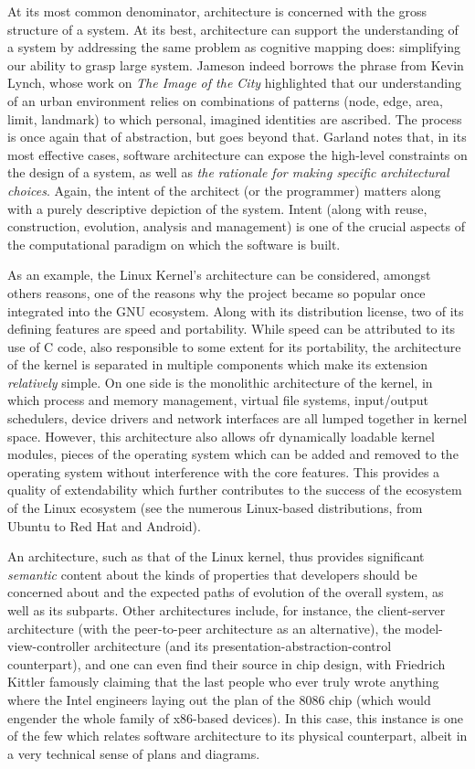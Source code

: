\documentclass{article}
\begin{document}
At its most common denominator, architecture is concerned with the gross structure of a system. At its best, architecture can support the understanding of a system by addressing the same problem as cognitive mapping does: simplifying our ability to grasp large system. Jameson indeed borrows the phrase from Kevin Lynch, whose work on \emph{The Image of the City} highlighted that our understanding of an urban environment relies on combinations of patterns (node, edge, area, limit, landmark) to which personal, imagined identities are ascribed. The process is once again that of abstraction, but goes beyond that. Garland notes that, in its most effective cases, software architecture can expose the high-level constraints on the design of a system, as well as \emph{the rationale for making specific architectural choices}. Again, the intent of the architect (or the programmer) matters along with a purely descriptive depiction of the system. Intent (along with reuse, construction, evolution, analysis and management) is one of the crucial aspects of the computational paradigm on which the software is built.

As an example, the Linux Kernel's architecture can be considered, amongst others reasons, one of the reasons why the project became so popular once integrated into the GNU ecosystem. Along with its distribution license, two of its defining features are speed and portability. While speed can be attributed to its use of C code, also responsible to some extent for its portability, the architecture of the kernel is separated in multiple components which make its extension \emph{relatively} simple. On one side is the monolithic architecture of the kernel, in which process and memory management, virtual file systems, input/output schedulers, device drivers and network interfaces are all lumped together in kernel space. However, this architecture also allows ofr dynamically loadable kernel modules, pieces of the operating system which can be added and removed to the operating system without interference with the core features. This provides a quality of extendability which further contributes to the success of the ecosystem of the Linux ecosystem (see the numerous Linux-based distributions, from Ubuntu to Red Hat and Android).

An architecture, such as that of the Linux kernel, thus provides significant \emph{semantic}  content  about  the  kinds  of properties that developers should be concerned about and the expected paths of evolution of the overall system, as well as its subparts. Other architectures include, for instance, the client-server architecture (with the peer-to-peer architecture as an alternative), the model-view-controller architecture (and its presentation-abstraction-control counterpart), and one can even find their source in chip design, with Friedrich Kittler famously claiming that the last people who ever truly wrote anything where the Intel engineers laying out the plan of the 8086 chip (which would engender the whole family of x86-based devices)\cite{kittler_there_1997}. In this case, this instance is one of the few which relates software architecture to its physical counterpart, albeit in a very technical sense of plans and diagrams.
\end{document}

